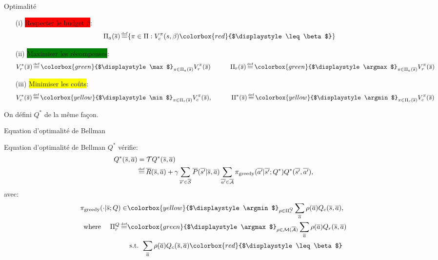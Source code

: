 \documentclass[french]{beamer}
\newcommand{\mathcolorbox}[2]{\colorbox{#1}{$\displaystyle #2$}}
\begin{document}
    \begin{frame}{Optimalité}
        \begin{definition}
            \begin{enumerate}
                \item[(i)] \pause\colorbox{red}{Respecter le budget $\beta$}:
                \begin{equation*}
                    \Pi_a(\os) \eqdef \{\pi\in\Pi: V_c^\pi(s, \beta) \mathcolorbox{red}{\leq \beta}\}
                \end{equation*}
                \item[(ii)] \pause\colorbox{green}{Maximiser les récompenses}:
                \begin{equation*}
                    V_r^*(\os) \eqdef \mathcolorbox{green}{\max}_{\pi\in\Pi_a(\os)}  V_r^\pi(\os) \qquad\quad \Pi_r(\os) \eqdef \mathcolorbox{green}{\argmax}_{\pi\in\Pi_a(\os)}  V_r^\pi(\os)
                \end{equation*}
                \item[(iii)] \pause\colorbox{yellow}{Minimiser les coûts}:
                \begin{equation*}
                    V_c^*(\os) \eqdef \mathcolorbox{yellow}{\min}_{\pi\in\Pi_r(\os)}  V_c^\pi(\os), \qquad\quad \Pi^*(\os) \eqdef \mathcolorbox{yellow}{\argmin}_{\pi\in\Pi_r(\os)}  V_c^\pi(\os)
                \end{equation*}
            \end{enumerate}

            \pause On défini $Q^*$ de la même façon.
        \end{definition}
    \end{frame}

    \begin{frame}{Equation d'optimalité de Bellman}
        \begin{block}{Equation d'optimalité de Bellman}
            $Q^*$ vérifie:
            \begin{align*}
                Q^{*}(\os, \oa) &= \cT Q^{*}(\os, \oa)\\
                &\eqdef \ov{R}(\os, \oa) + \gamma \sum_{\os'\in\ocS} \ov{P}(\ov{s'} | \os, \oa)\sum_{\ov{a'}\in \ocA} \pi_\text{greedy}(\ov{a'}|\ov{s'}; Q^*) Q^{*}(\ov{s'}, \ov{a'}),
            \end{align*}
            avec:\pause
            \begin{align*}
                \pi_\text{greedy}(\cdot|\os; Q) \in &\mathcolorbox{yellow}{\argmin}_{\rho\in\Pi_r^Q} \sum_{\oa}\rho(\oa) Q_c(\os, \oa), \\
                \text{where }\quad \Pi_r^Q \eqdef &\mathcolorbox{green}{\argmax}_{\rho\in\cM(\ocA)} \sum_{\oa}\rho(\oa) Q_r(\os, \oa) \\
                & \text{ s.t. }   \sum_{\oa}\rho(\oa) Q_c(\os, \oa) \mathcolorbox{red}{\leq \beta}
            \end{align*}
        \end{block}
    \end{frame}
\end{document}
